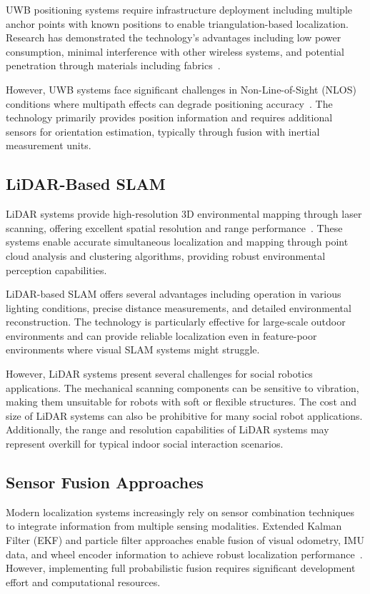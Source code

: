UWB positioning systems require infrastructure deployment including multiple anchor points with known positions to enable triangulation-based localization. Research has demonstrated the technology's advantages including low power consumption, minimal interference with other wireless systems, and potential penetration through materials including fabrics~\cite{rpo2019uwb}.

However, UWB systems face significant challenges in Non-Line-of-Sight (NLOS) conditions where multipath effects can degrade positioning accuracy~\cite{luo2020uwb}. The technology primarily provides position information and requires additional sensors for orientation estimation, typically through fusion with inertial measurement units.

\subsection{LiDAR-Based SLAM}
LiDAR systems provide high-resolution 3D environmental mapping through laser scanning, offering excellent spatial resolution and range performance~\cite{yan2019lidar}. These systems enable accurate simultaneous localization and mapping through point cloud analysis and clustering algorithms, providing robust environmental perception capabilities.

LiDAR-based SLAM offers several advantages including operation in various lighting conditions, precise distance measurements, and detailed environmental reconstruction. The technology is particularly effective for large-scale outdoor environments and can provide reliable localization even in feature-poor environments where visual SLAM systems might struggle.

However, LiDAR systems present several challenges for social robotics applications. The mechanical scanning components can be sensitive to vibration, making them unsuitable for robots with soft or flexible structures. The cost and size of LiDAR systems can also be prohibitive for many social robot applications. Additionally, the range and resolution capabilities of LiDAR systems may represent overkill for typical indoor social interaction scenarios.

\subsection{Sensor Fusion Approaches}
Modern localization systems increasingly rely on sensor combination techniques to integrate information from multiple sensing modalities. Extended Kalman Filter (EKF) and particle filter approaches enable fusion of visual odometry, IMU data, and wheel encoder information to achieve robust localization performance~\cite{huang2021sensor}. However, implementing full probabilistic fusion requires significant development effort and computational resources.

